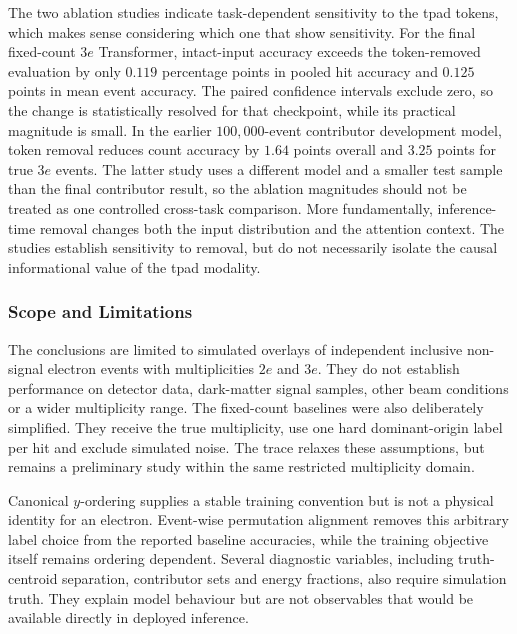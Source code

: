 The two ablation studies indicate task-dependent sensitivity to the
\gls{tpad} tokens, which makes sense considering which one that show sensitivity. For the final fixed-count \(3e\) Transformer, intact-input
accuracy exceeds the token-removed evaluation by only \(0.119\) percentage
points in pooled hit accuracy and \(0.125\) points in mean event accuracy.
The paired confidence intervals exclude zero, so the change is statistically
resolved for that checkpoint, while its practical magnitude is small. In the
earlier \(100{,}000\)-event contributor development model, token removal
reduces count accuracy by \(1.64\) points overall and \(3.25\) points for
true \(3e\) events. The latter study uses a different model and a smaller
test sample than the final contributor result, so the ablation magnitudes
should not be treated as one controlled cross-task comparison. More
fundamentally, inference-time removal changes both the input distribution and
the attention context. The studies establish sensitivity to removal, but do
not necessarily isolate the causal informational value of the \gls{tpad} modality.

\subsubsection{Scope and Limitations}

The conclusions are limited to simulated overlays of independent inclusive
non-signal electron events with multiplicities $2e$ and $3e$. They do not
establish performance on detector data, dark-matter signal samples, other
beam conditions or a wider multiplicity range. The fixed-count baselines were
also deliberately simplified. They receive the true multiplicity, use one
hard dominant-origin label per hit and exclude simulated noise. The
\gls{trace} relaxes these assumptions, but remains a preliminary study
within the same restricted multiplicity domain. 

Canonical \(y\)-ordering supplies a stable training convention but is not a
physical identity for an electron. Event-wise permutation alignment removes
this arbitrary label choice from the reported baseline accuracies, while the
training objective itself remains ordering dependent. Several diagnostic
variables, including truth-centroid separation, contributor sets and energy
fractions, also require simulation truth. They explain model behaviour but
are not observables that would be available directly in deployed inference.

